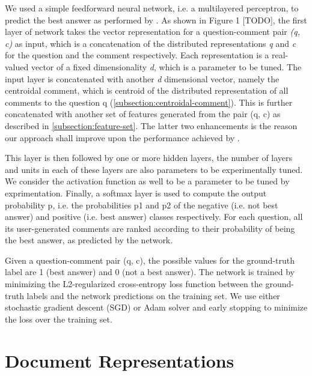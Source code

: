 \documentclass[12pt, a4paper, oneside]{Thesis} %
\begin{document}
We used a simple feedforward neural network, i.e. a multilayered perceptron, to predict the best answer as performed by \cite{bogdanova2016we}. As shown in Figure 1 [TODO], the first layer of network takes the vector representation for a question-comment pair \textit{(q, c)} as input, which is a concatenation of the distributed representations \textit{q} and \textit{c} for the question and the comment respectively. Each representation is a real-valued vector of a fixed dimensionality \textit{d}, which is a parameter to be tuned. The input layer is concatenated with another \textit{d} dimensional vector, namely the centroidal comment, which is centroid of the distributed representation of all comments to the question q (\autoref{subsection:centroidal-comment}). This is further concatenated with another set of features generated from the pair (q, c) as described in \autoref{subsection:feature-set}. The latter two enhancements is the reason our approach shall improve upon the performance achieved by \cite{bogdanova2016we}.

This layer is then followed by one or more hidden layers, the number of layers and units in each of these layers are also parameters to be experimentally tuned. We consider the activation function as well to be a parameter to be tuned by exprimentation. Finally, a softmax layer is used to compute the output probability p, i.e. the probabilities p1 and p2 of the negative (i.e. not best answer) and positive (i.e. best answer) classes respectively. For each question, all its user-generated comments are ranked according to their probability of being the best answer, as predicted by the network.

Given a question-comment pair (q, c), the possible values for the ground-truth label are 1 (best answer) and 0 (not a best answer). The network is trained by minimizing the L2-regularized cross-entropy loss function between the ground-truth labels and the network predictions on the training set. We use either stochastic gradient descent (SGD) or Adam solver and early stopping to minimize the loss over the training set.

\section{Document Representations}
\end{document}
